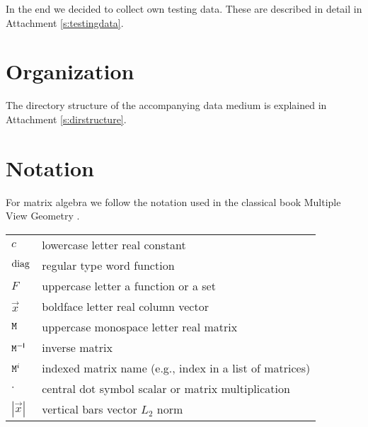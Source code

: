 In the end we decided to collect own testing data.
These are described in detail in Attachment \ref{s:testingdata}.

\section{Organization}

The directory structure of the accompanying data medium is explained in Attachment \ref{s:dirstructure}.

\section{Notation}

For matrix algebra we follow the notation used in the classical book Multiple View Geometry \cite{hartley03}.

\begin{table}[h!]
\centering
\begin{tabularx}{\textwidth}{lX}
$c$ & lowercase letter \dotfill real constant \\
$\mathrm{diag}$ & regular type word \dotfill function \\
$F$ & uppercase letter \dotfill a function or a set \\
$\vec x$ & boldface letter \dotfill real column vector \\
$\mathtt{M}$ & uppercase monospace letter \dotfill real matrix \\
$\mathtt{M}^{-\mathsf{I}}$ & \dotfill inverse matrix \\
$\mathtt{M}^i$ & \dotfill indexed matrix name (e.g., index in a list of matrices) \\
$\cdot$ & central dot symbol \dotfill scalar or matrix multiplication \\
$|\vec x|$ & vertical bars \dotfill vector $L_2$ norm \\
\end{tabularx}
\end{table}
